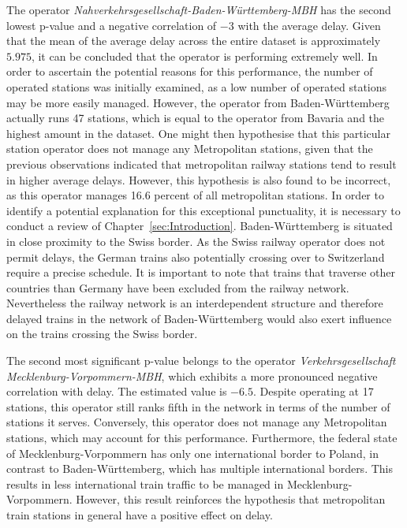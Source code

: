 \documentclass[12pt,a4paper]{article}
\begin{document}
The operator \textit{Nahverkehrsgesellschaft-Baden-Württemberg-MBH} has the second lowest p-value and a negative correlation of $-3$ with the average delay. 
Given that the mean of the average delay across the entire dataset is approximately $5.975$, it can be concluded that the operator is performing extremely well. 
In order to ascertain the potential reasons for this performance, the number of operated stations was initially examined, as a low number of operated stations may be more easily managed. 
However, the operator from Baden-Württemberg actually runs 47 stations, which is equal to the operator from Bavaria and the highest amount in the dataset. 
One might then hypothesise that this particular station operator does not manage any Metropolitan stations, given that the previous observations indicated that metropolitan railway stations tend to result in higher average delays. 
However, this hypothesis is also found to be incorrect, as this operator manages 16.6 percent of all metropolitan stations. 
In order to identify a potential explanation for this exceptional punctuality, it is necessary to conduct a review of Chapter~\ref{sec:Introduction}. 
Baden-Württemberg is situated in close proximity to the Swiss border. As the Swiss railway operator does not permit delays, the German trains also potentially crossing over to Switzerland require a precise schedule. 
It is important to note that trains that traverse other countries than Germany have been excluded from the railway network. Nevertheless the railway network is an interdependent structure and therefore delayed trains in the network of Baden-Württemberg would also exert influence on the trains crossing the Swiss border.

The second most significant p-value belongs to the operator \textit{Verkehrsgesellschaft Mecklenburg-Vorpommern-MBH}, which exhibits a more pronounced negative correlation with delay. 
The estimated value is $-6.5$. Despite operating at 17 stations, this operator still ranks fifth in the network in terms of the number of stations it serves. 
Conversely, this operator does not manage any Metropolitan stations, which may account for this performance. 
Furthermore, the federal state of Mecklenburg-Vorpommern has only one international border to Poland, in contrast to Baden-Württemberg, which has multiple international borders. 
This results in less international train traffic to be managed in Mecklenburg-Vorpommern. However, this result reinforces the hypothesis that metropolitan train stations in general have a positive effect on delay.
\end{document}
